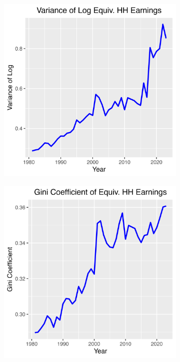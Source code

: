 \documentclass{article}
\begin{document}
\begin{figure}
    \centering
    \begin{subfigure}[t]{0.475\textwidth}
        \centering
        \includegraphics[width=\textwidth]{figures/Fig_1/Fig_1a_Var_Earnings.png}
        \label{fig:earnings_inequality_Var}
    \end{subfigure}
    \begin{subfigure}[t]{0.475\textwidth}
        \centering
        \includegraphics[width=\textwidth]{figures/Fig_1/Fig_1b_Gini_Earnings.png}

\end{subfigure}
\end{figure}
\end{document}
